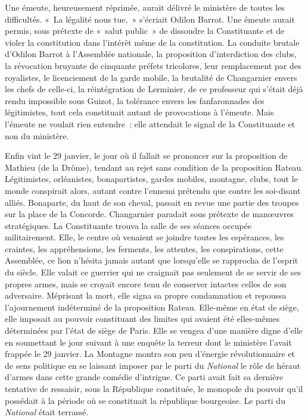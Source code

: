 \documentclass[twoside]{book} %
\begin{document}
Une émeute, heureusement réprimée, aurait délivré le ministère de toutes les difficultés. « La légalité nous tue, » s’écriait Odilon Barrot. Une émeute aurait permis, sous prétexte de « salut public » de dissoudre la Constituante et de violer la constitution dans l’intérêt même de la constitution. La conduite brutale d’Odilon Barrot à l’Assemblée nationale, la proposition d’interdiction des clubs, la révocation bruyante de cinquante préfets tricolores, leur remplacement par des royalistes, le licenciement de la garde mobile, la brutalité de Changarnier envers les chefs de celle-ci, la réintégration de Lerminier, de ce professeur qui s’était déjà rendu impossible sous Guizot, la tolérance envers les fanfaronnades des légitimistes, tout cela constituait autant de provocations à l’émeute. Mais l’émeute ne voulait rien entendre ; elle attendait le signal de la Constituante et non du ministère.\par
Enfin vint le 29 janvier, le jour où il fallait se prononcer sur la proposition de Mathieu (de la Drôme), tendant au rejet sans condition de la proposition Rateau. Légitimistes, orléanistes, bonapartistes, gardes mobiles, montagne, clubs, tout le monde conspirait alors, autant contre l’ennemi prétendu que contre les soi-disant alliés. Bonaparte, du haut de son cheval, passait en revue une partie des troupes sur la place de la Concorde. Changarnier paradait sous prétexte de manœuvres stratégiques. La Constituante trouva la salle de ses séances occupée militairement. Elle, le centre où venaient se joindre toutes les espérances, les craintes, les appréhensions, les ferments, les attentes, les conspirations, cette Assemblée, ce lion n’hésita jamais autant que lorsqu’elle se rapprocha de l’esprit du siècle. Elle valait ce guerrier qui ne craignait pas seulement de se servir de ses propres armes, mais se croyait encore tenu de conserver intactes celles de son adversaire. Méprisant la mort, elle signa sa propre condamnation et repoussa l’ajournement indéterminé de la proposition Rateau. Elle-même en état de siège, elle imposait au pouvoir constituant des limites qui avaient été elles-mêmes déterminées par l’état de siège de Paris. Elle se vengea d’une manière digne d’elle en soumettant le jour suivant à une enquête la terreur dont le ministère l’avait frappée le 29 janvier. La Montagne montra son peu d’énergie révolutionnaire et de sens politique en se laissant imposer par le parti du \emph{National} le rôle de héraut d’armes dans cette grande comédie d’intrigue. Ce parti avait fait sa dernière tentative de ressaisir, sous la République constituée, le monopole du pouvoir qu’il possédait à la période où se constituait la république bourgeoise. Le parti du \emph{National} était terrassé.\par
\end{document}
